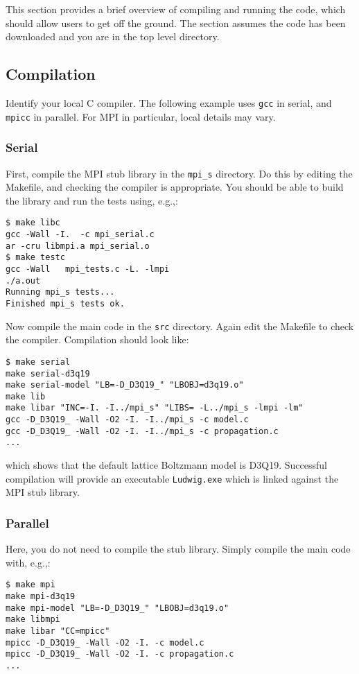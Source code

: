 This section provides a brief overview of compiling and running
the code, which should allow users to get off the ground.
The section assumes the code has been downloaded and you are in the
top level directory.

\subsection{Compilation}

Identify your local C compiler. The following example uses \texttt{gcc}
in serial, and \texttt{mpicc} in parallel. For MPI in particular,
local details may vary.

\subsubsection{Serial}
\label{section:quick-serial}

First, compile the MPI stub library in the \texttt{mpi\_s}
directory. Do this by editing the Makefile, and checking the compiler
is appropriate. You should be able to build the library and run the
tests using, e.g.,:

\begin{lstlisting}
$ make libc
gcc -Wall -I.  -c mpi_serial.c
ar -cru libmpi.a mpi_serial.o
$ make testc
gcc -Wall   mpi_tests.c -L. -lmpi
./a.out
Running mpi_s tests...
Finished mpi_s tests ok.
\end{lstlisting}

Now compile the main code in the \texttt{src} directory. Again
edit the Makefile to check the compiler. Compilation should
look like:

\begin{lstlisting}
$ make serial
make serial-d3q19
make serial-model "LB=-D_D3Q19_" "LBOBJ=d3q19.o"
make lib
make libar "INC=-I. -I../mpi_s" "LIBS= -L../mpi_s -lmpi -lm"
gcc -D_D3Q19_ -Wall -O2 -I. -I../mpi_s -c model.c
gcc -D_D3Q19_ -Wall -O2 -I. -I../mpi_s -c propagation.c
...
\end{lstlisting}
which shows that the default lattice Boltzmann model is D3Q19.
Successful compilation will provide an executable \texttt{Ludwig.exe}
which is linked against the MPI stub library.

\subsubsection{Parallel}

Here, you do not need to compile the stub library. Simply compile
the main code with, e.g.,:
\begin{lstlisting}
$ make mpi
make mpi-d3q19
make mpi-model "LB=-D_D3Q19_" "LBOBJ=d3q19.o"
make libmpi
make libar "CC=mpicc"
mpicc -D_D3Q19_ -Wall -O2 -I. -c model.c
mpicc -D_D3Q19_ -Wall -O2 -I. -c propagation.c
...
\end{lstlisting}

